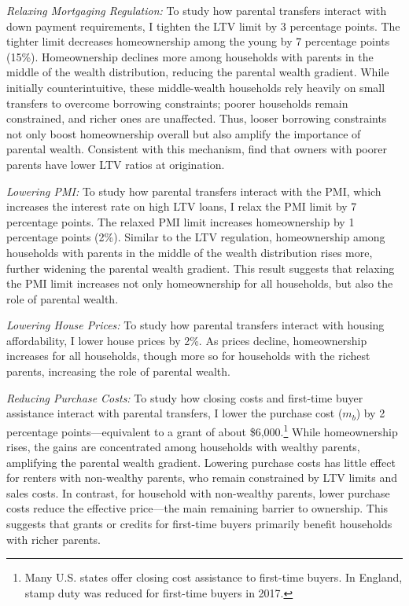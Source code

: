 \documentclass[12pt]{article}
\begin{document}
\textit{Relaxing Mortgaging Regulation:} To study how parental transfers interact with down payment requirements, I tighten the LTV limit by 3 percentage points. The tighter limit decreases homeownership among the young by 7 percentage points (15\%). Homeownership declines more among households with parents in the middle of the wealth distribution, reducing the parental wealth gradient. While initially counterintuitive, these middle-wealth households rely heavily on small transfers to overcome borrowing constraints; poorer households remain constrained, and richer ones are unaffected. Thus, looser borrowing constraints not only boost homeownership overall but also amplify the importance of parental wealth. Consistent with this mechanism, \citet{wold2024housing} find that owners with poorer parents have lower LTV ratios at origination.

\textit{Lowering PMI:} To study how parental transfers interact with the PMI, which increases the interest rate on high LTV loans, I relax the PMI limit by 7 percentage points. The relaxed PMI limit increases homeownership by 1 percentage points (2\%). Similar to the LTV regulation, homeownership among households with parents in the middle of the wealth distribution rises more, further widening the parental wealth gradient. This result suggests that relaxing the PMI limit increases not only homeownership for all households, but also the role of parental wealth.

\textit{Lowering House Prices:} To study how parental transfers interact with housing affordability, I lower house prices by 2\%. As prices decline, homeownership increases for all households, though more so for households with the richest parents, increasing the role of parental wealth.

\textit{Reducing Purchase Costs:} To study how closing costs and first-time buyer assistance interact with parental transfers, I lower the purchase cost ($m_b$) by 2 percentage points---equivalent to a grant of about \$6,000.\footnote{Many U.S. states offer closing cost assistance to first-time buyers. In England, stamp duty was reduced for first-time buyers in 2017.} While homeownership rises, the gains are concentrated among households with wealthy parents, amplifying the parental wealth gradient. Lowering purchase costs has little effect for renters with non-wealthy parents, who remain constrained by LTV limits and sales costs. In contrast, for household with non-wealthy parents, lower purchase costs reduce the effective price—the main remaining barrier to ownership. This suggests that grants or credits for first-time buyers primarily benefit households with richer parents.
 
\end{document}
